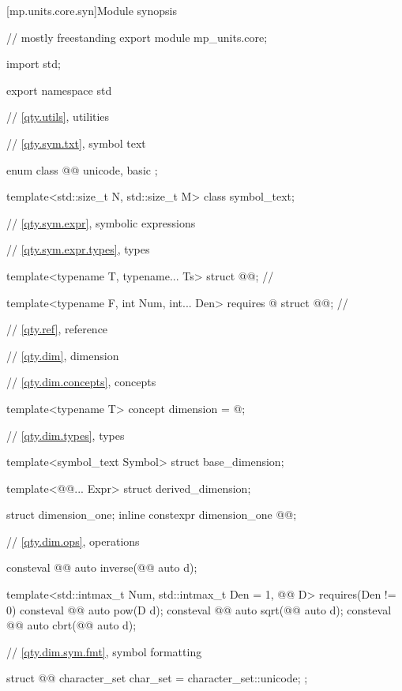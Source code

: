 [mp.units.core.syn]{Module  synopsis}
%
\begin{codeblock}
// mostly freestanding
export module mp_units.core;

import std;

export namespace std {

// \ref{qty.utils}, utilities

// \ref{qty.sym.txt}, symbol text

enum class @@ { unicode, basic };

template<std::size_t N, std::size_t M>
class symbol_text;

// \ref{qty.sym.expr}, symbolic expressions

// \ref{qty.sym.expr.types}, types

template<typename T, typename... Ts>
struct @@;  // \expos

template<typename F, int Num, int... Den>
  requires @\seebelownc@
struct @@;  // \expos

// \ref{qty.ref}, reference

// \ref{qty.dim}, dimension

// \ref{qty.dim.concepts}, concepts

template<typename T>
concept dimension = @\seebelownc@;

// \ref{qty.dim.types}, types

template<symbol_text Symbol>
struct base_dimension;

template<@@... Expr>
struct derived_dimension;

struct dimension_one;
inline constexpr dimension_one @@{};

// \ref{qty.dim.ops}, operations

consteval @@ auto inverse(@@ auto d);

template<std::intmax_t Num, std::intmax_t Den = 1, @@ D>
  requires(Den != 0)
consteval @@ auto pow(D d);
consteval @@ auto sqrt(@@ auto d);
consteval @@ auto cbrt(@@ auto d);

// \ref{qty.dim.sym.fmt}, symbol formatting

struct @@ {
  character_set char_set = character_set::unicode;
};

}
\end{codeblock}
